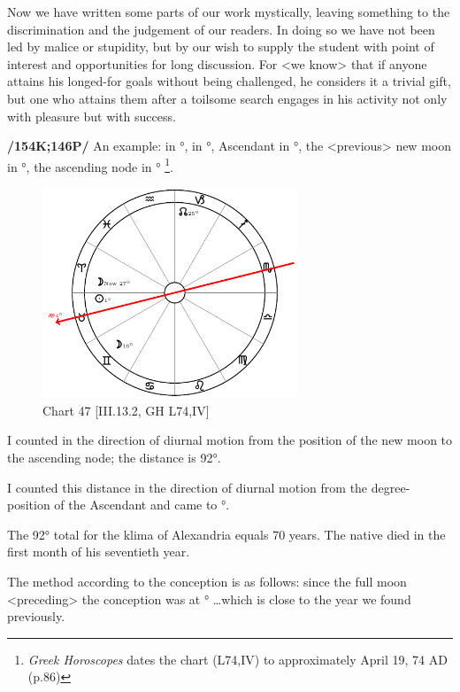 Now we have written some parts of our work mystically, leaving something to the discrimination and the judgement of our readers. In doing so we have not been led by malice or stupidity, but by our wish to supply the student with point of interest and opportunities for long discussion. For <we know> that if anyone attains his longed-for goals without being challenged, he considers it a trivial gift, but one
who attains them after a toilsome search engages in his activity not only with pleasure but with success.

\textbf{/154K;146P/} An example: \Sun\xspace in \Taurus\xspace 1°, \Moon\xspace in \Gemini\xspace 16°, Ascendant in \Taurus\xspace 14°, the <previous> new moon in \Aries\xspace 27°, the ascending node in \Capricorn\xspace 25°
\footnote{\textit{Greek Horoscopes} dates the chart (L74,IV) to approximately April 19, 74 AD (p.86)}.

\clearpage
\begin{figure}
\centering
\vspace{-20pt}
\includegraphics[width=0.68\textwidth]{charts/3_13_2}
\caption{Chart 47 [III.13.2, GH L74,IV]}
\label{fig:chart47}
\end{figure}

I counted in the direction of diurnal motion from the position of the new moon to the ascending node; the distance is 92°. 

I counted this distance in the direction of diurnal motion from the degree-position of the Ascendant and came to \Aquarius\xspace 12°. 

The 92° total for the klima of Alexandria equals 70 years. The native died in the first month of his seventieth year. 

The method according to the conception is as follows: since the full moon <preceding> the conception was at \Capricorn\xspace 21° \ldots which is close to the year we found previously.


